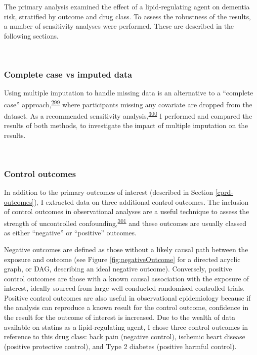 \documentclass[a4paper, twoside]{templates/ociamthesis}
\begin{document}
The primary analysis examined the effect of a lipid-regulating agent on dementia risk, stratified by outcome and drug class. To assess the robustness of the results, a number of sensitivity analyses were performed. These are described in the following sections.

~

\hypertarget{complete-case-vs-imputed-data}{%
\subsubsection{Complete case vs imputed data}\label{complete-case-vs-imputed-data}}

Using multiple imputation to handle missing data is an alternative to a ``complete case'' approach,\textsuperscript{\protect\hyperlink{ref-pigott2001}{299}} where participants missing any covariate are dropped from the dataset. As a recommended sensitivity analysis,\textsuperscript{\protect\hyperlink{ref-hughes2019}{300}} I performed and compared the results of both methods, to investigate the impact of multiple imputation on the results.

~

\hypertarget{control-outcomes}{%
\subsubsection{Control outcomes}\label{control-outcomes}}

In addition to the primary outcomes of interest (described in Section \ref{cprd-outcomes}), I extracted data on three additional control outcomes. The inclusion of control outcomes in observational analyses are a useful technique to assess the strength of uncontrolled confounding,\textsuperscript{\protect\hyperlink{ref-lipsitch2010}{301}} and these outcomes are usually classed as either ``negative'' or ``positive'' outcomes.

Negative outcomes are defined as those without a likely causal path between the exposure and outcome (see Figure \ref{fig:negativeOutcome} for a directed acyclic graph, or DAG, describing an ideal negative outcome). Conversely, positive control outcomes are those with a known causal association with the exposure of interest, ideally sourced from large well conducted randomised controlled trials. Positive control outcomes are also useful in observational epidemiology because if the analysis can reproduce a known result for the control outcome, confidence in the result for the outcome of interest is increased. Due to the wealth of data available on statins as a lipid-regulating agent, I chose three control outcomes in reference to this drug class: back pain (negative control), ischemic heart disease (positive protective control), and Type 2 diabetes (positive harmful control).
\end{document}
